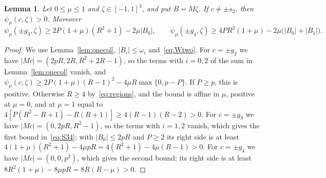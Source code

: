\documentclass[11pt]{article}
\newtheorem{lemma}[theorem]{Lemma}
\theoremstyle{remark}
\begin{document}
\begin{lemma}\label{lem:colS}
Let $0\le\mu\le1$ and $\zeta\in[-1,1]^3$, and put $B=M\zeta$. If
$c\ne\pm s_2$, then $\psi_\mu(c,\zeta)>0$. Moreover
\begin{equation}\label{eq:S34}
\psi_\mu(\pm g_3,\zeta)\ge2P(1+\mu)(R^2+1)-2\mu|B_0|,\qquad
\psi_\mu(\pm g_4,\zeta)\ge4PR^2(1+\mu)-2\mu\bigl(|B_0|+|B_1|\bigr).
\end{equation}
\end{lemma}
\begin{proof}
We use Lemma~\ref{lem:onecol}, $|B_i|\le\omega_i$ and~\eqref{eq:Wtwo}. For
$c=\pm g_2$ we have $|Mc|=(2pR,2R,R^2+2R-1)$, so the terms with $i=0,2$ of
the sum in Lemma~\ref{lem:onecol} vanish, and
$\psi_\mu(c,\zeta)\ge2P(1+\mu)(R-1)^2-4\mu R\max\{0,p-P\}$. If $P\ge p$, this
is positive. Otherwise $R\ge4$ by~\eqref{eq:regions}, and the bound is affine
in $\mu$, positive at $\mu=0$, and at $\mu=1$ equal to
$4[P(R^2-R+1)-R(R+1)]\ge4(R-1)(R-2)>0$. For $c=\pm g_3$ we have
$|Mc|=(0,2pR,R^2-1)$, so the terms with $i=1,2$ vanish, which gives the first
bound in~\eqref{eq:S34}; with $|B_0|\le2pR$ and $P\ge2$ its right side is at
least $4(1+\mu)(R^2+1)-4\mu pR=4(R^2+1)-4\mu(R-1)>0$. For $c=\pm g_4$ we have
$|Mc|=(0,0,p^2)$, which gives the second bound; its right side is at least
$8R^2(1+\mu)-8\mu pR=8R(R-\mu)>0$.
\end{proof}
\end{document}
